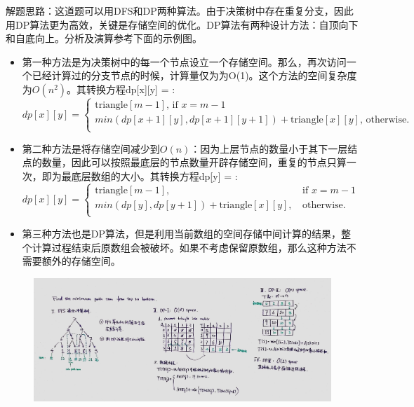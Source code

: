 \documentclass[a4paper,10pt]{article}
\begin{document}
\begin{CJK*}{UTF8}{gbsn}
\noindent 解题思路：这道题可以用DFS和DP两种算法。由于决策树中存在重复分支，因此用DP算法更为高效，关键是存储空间的优化。DP算法有两种设计方法：自顶向下和自底向上。分析及演算参考下面的示例图。
\begin{itemize}
    \item 第一种方法是为决策树中的每一个节点设立一个存储空间。那么，再次访问一个已经计算过的分支节点的时候，计算量仅为为O(1)。这个方法的空间复杂度为$O(n^2)$。其转换方程dp[x][y] = : 
    \[ dp[x][y] =
      \begin{cases}
        \textrm{triangle}[m-1], \, \text{if } x=m-1\\
        min(dp[x+1][y], dp[x+1][y+1])+\textrm{triangle}[x][y], \, \text{otherwise. } \\
      \end{cases}
    \]
    
    \item 第二种方法是将存储空间减少到$O(n)$：因为上层节点的数量小于其下一层结点的数量，因此可以按照最底层的节点数量开辟存储空间，重复的节点只算一次，即为最底层数组的大小。其转换方程dp[y] = : 
    \[ dp[x][y] =
      \begin{cases}
        \textrm{triangle}[m-1],       & \, \text{if } x=m-1\\
        min(dp[y], dp[y+1])+\textrm{triangle}[x][y],  & \, \text{otherwise. } \\
      \end{cases}
    \]
    
    \item 第三种方法也是DP算法，但是利用当前数组的空间存储中间计算的结果，整个计算过程结束后原数组会被破坏。如果不考虑保留原数组，那么这种方法不需要额外的存储空间。
\end{itemize}
\end{CJK*}

\begin{figure}[h]
    \includegraphics[width=1\textwidth]{leetcode120.jpg}
    \centering\\
\end{figure}
\end{document}
